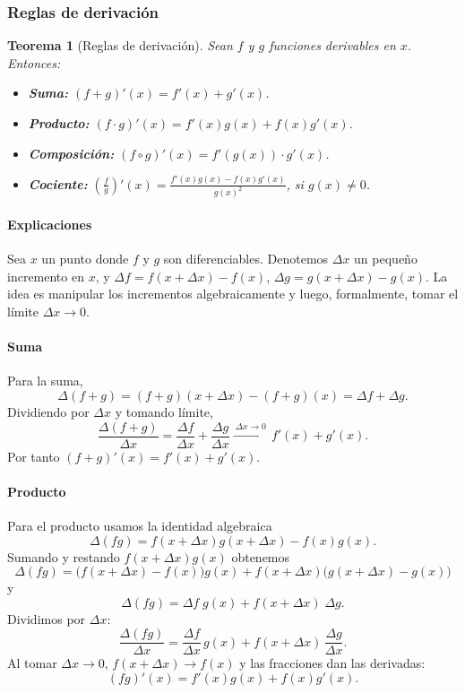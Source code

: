 \documentclass[12pt, a4paper]{article}
\theoremstyle{rioplatense}
\newtheorem{teorema}{Teorema}[section]
\begin{document}
\subsubsection{Reglas de derivación}
\begin{teorema}[Reglas de derivación]
    Sean $f$ y $g$ funciones derivables en $x$. Entonces:
    \begin{itemize}
        \item \textbf{Suma:} $(f + g)'(x) = f'(x) + g'(x)$.

        \item \textbf{Producto:} $(f \cdot g)'(x) = f'(x)g(x) + f(x)g'(x)$.

        \item \textbf{Composición:} $(f \circ g)'(x) = f'(g(x)) \cdot g'(x)$.
        
        \item \textbf{Cociente:} $\displaystyle \left(\frac{f}{g}\right)'(x) = \frac{f'(x)g(x) - f(x)g'(x)}{g(x)^2}$, si $g(x) \neq 0$.
    \end{itemize}
\end{teorema}

\paragraph{Explicaciones}
Sea \(x\) un punto donde \(f\) y \(g\) son diferenciables. Denotemos \(\Delta x\) un pequeño incremento en \(x\), y \(\Delta f=f(x+\Delta x)-f(x)\), \(\Delta g=g(x+\Delta x)-g(x)\). La idea es manipular los incrementos algebraicamente y luego, formalmente, tomar el límite \(\Delta x\to 0\).

\paragraph{Suma}
Para la suma,
\[
\Delta(f+g)=(f+g)(x+\Delta x)-(f+g)(x)=\Delta f+\Delta g.
\]
Dividiendo por \(\Delta x\) y tomando límite,
\[
\frac{\Delta(f+g)}{\Delta x}=\frac{\Delta f}{\Delta x}+\frac{\Delta g}{\Delta x}\xrightarrow{\ \Delta x\to0\ } f'(x)+g'(x).
\]
Por tanto \((f+g)'(x)=f'(x)+g'(x)\).

\paragraph{Producto}
Para el producto usamos la identidad algebraica
\[
\Delta(fg)=f(x+\Delta x)g(x+\Delta x)-f(x)g(x).
\]
Sumando y restando \(f(x+\Delta x)g(x)\) obtenemos
\[
\Delta(fg)=\big(f(x+\Delta x)-f(x)\big)g(x)+f(x+\Delta x)\big(g(x+\Delta x)-g(x)\big)
\]
y
\[
\Delta(fg)%
=\Delta f\; g(x)+f(x+\Delta x)\;\Delta g.
\]
Dividimos por \(\Delta x\):
\[
\frac{\Delta(fg)}{\Delta x}=\frac{\Delta f}{\Delta x}\,g(x)+f(x+\Delta x)\,\frac{\Delta g}{\Delta x}.
\]
Al tomar \(\Delta x\to0\), \(f(x+\Delta x)\to f(x)\) y las fracciones dan las derivadas:
\[
(fg)'(x)=f'(x)g(x)+f(x)g'(x).
\]
\end{document}

